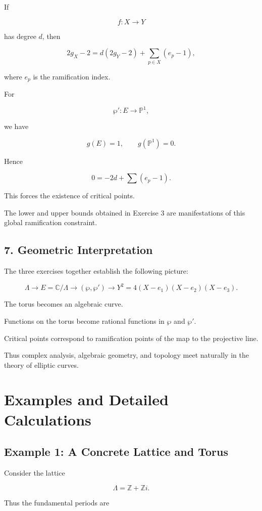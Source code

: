 \documentclass[12pt,a4paper]{article}
\theoremstyle{notespace}
\begin{document}
If

\[
f:X\to Y
\]

has degree \(d\), then

\[
2g_X-2
=
d(2g_Y-2)
+
\sum_{p\in X}(e_p-1),
\]

where \(e_p\) is the ramification index.

For

\[
\wp':E\to\mathbb P^1,
\]

we have

\[
g(E)=1,
\qquad
g(\mathbb P^1)=0.
\]

Hence

\[
0
=
-2d
+
\sum (e_p-1).
\]

This forces the existence of critical points.

The lower and upper bounds obtained in Exercise 3 are manifestations of this global ramification constraint.

\subsection{7. Geometric Interpretation}

The three exercises together establish the following picture:

\[
\Lambda
\longrightarrow
E=\mathbb C/\Lambda
\longrightarrow
(\wp,\wp')
\longrightarrow
Y^2=4(X-e_1)(X-e_2)(X-e_3).
\]

The torus becomes an algebraic curve.

Functions on the torus become rational functions in \(\wp\) and \(\wp'\).

Critical points correspond to ramification points of the map to the projective line.

Thus complex analysis, algebraic geometry, and topology meet naturally in the theory of elliptic curves.

\section{Examples and Detailed Calculations}

\subsection{Example 1: A Concrete Lattice and Torus}

Consider the lattice

\[
\Lambda=\mathbb Z+\mathbb Zi.
\]

Thus the fundamental periods are
\end{document}

